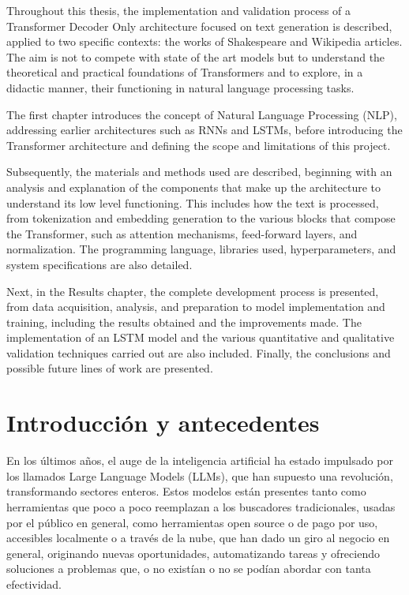 \documentclass[11pt]{book}
\newcommand{\clearemptydoublepage}{\newpage{\pagestyle{empty}\cleardoublepage}}
\begin{document}
Throughout this thesis, the implementation and validation process of a Transformer Decoder Only architecture focused on text generation is described, applied to two specific contexts: the works of Shakespeare and Wikipedia articles. The aim is not to compete with state of the art models but to understand the theoretical and practical foundations of Transformers and to explore, in a didactic manner, their functioning in natural language processing tasks.

The first chapter introduces the concept of Natural Language Processing (NLP), addressing earlier architectures such as RNNs and LSTMs, before introducing the Transformer architecture and defining the scope and limitations of this project.

Subsequently, the materials and methods used are described, beginning with an analysis and explanation of the components that make up the architecture to understand its low level functioning. This includes how the text is processed, from tokenization and embedding generation to the various blocks that compose the Transformer, such as attention mechanisms, feed-forward layers, and normalization. The programming language, libraries used, hyperparameters, and system specifications are also detailed.

Next, in the Results chapter, the complete development process is presented, from data acquisition, analysis, and preparation to model implementation and training, including the results obtained and the improvements made. The implementation of an LSTM model and the various quantitative and qualitative validation techniques carried out are also included. Finally, the conclusions and possible future lines of work are presented.

\clearemptydoublepage

\tableofcontents

\clearemptydoublepage

\mainmatter             %
\pagestyle{miestilo}    %

\chapter{Introducción y antecedentes}

En los últimos años, el auge de la inteligencia artificial ha estado impulsado por los llamados Large Language Models (LLMs), que han supuesto una revolución, transformando sectores enteros. Estos modelos están presentes tanto como herramientas que poco a poco reemplazan a los buscadores tradicionales, usadas por el público en general, como herramientas open source o de pago por uso, accesibles localmente o a través de la nube, que han dado un giro al negocio en general, originando nuevas oportunidades, automatizando tareas y ofreciendo soluciones a problemas que, o no existían o no se podían abordar con tanta efectividad.
\end{document}
